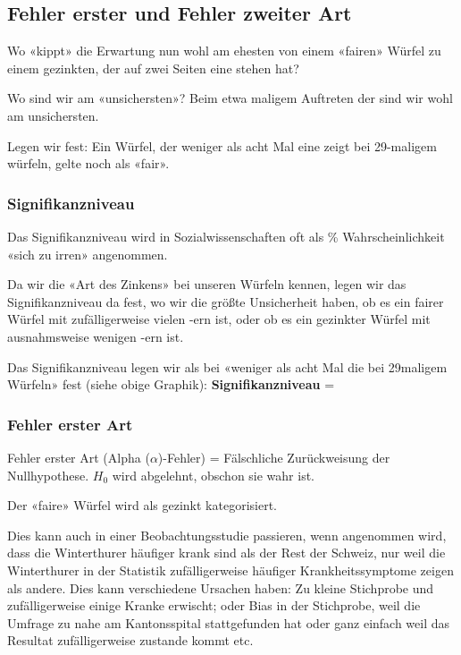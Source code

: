 \newpage


\subsection{Fehler erster und Fehler zweiter Art}
Wo «kippt» die Erwartung nun wohl am ehesten von einem «fairen» Würfel
zu einem gezinkten, der auf zwei Seiten eine  stehen hat?

Wo sind wir am «unsichersten»?
Beim etwa  maligem Auftreten der  sind wir
wohl am unsichersten.

Legen wir fest: Ein Würfel, der weniger als acht Mal
eine  zeigt bei 29-maligem würfeln, gelte noch als «fair».

\subsubsection{Signifikanzniveau}
Das Signifikanzniveau wird in Sozialwissenschaften oft als  \%
Wahrscheinlichkeit «sich zu irren» angenommen.

Da wir die «Art des Zinkens» bei unseren Würfeln kennen, legen wir das
Signifikanzniveau da fest, wo wir die größte Unsicherheit haben, ob
es ein fairer Würfel mit zufälligerweise vielen -ern ist,
oder ob es ein gezinkter Würfel mit ausnahmsweise wenigen
-ern ist.

Das Signifikanzniveau legen wir als bei «weniger als acht Mal die
 bei 29maligem Würfeln» fest (siehe obige Graphik):
\vspace{15mm}
\textbf{Signifikanzniveau} = 


\subsubsection{Fehler erster Art}
Fehler erster Art (Alpha ($\alpha$)-Fehler) = Fälschliche
Zurückweisung der Nullhypothese. $H_0$ wird abgelehnt, obschon sie
wahr ist. 

Der «faire» Würfel wird als gezinkt kategorisiert.

Dies kann auch in einer Beobachtungsstudie passieren, wenn \zB
angenommen wird, dass die Winterthurer häufiger krank sind als der
Rest der Schweiz, nur weil die Winterthurer in der Statistik
zufälligerweise häufiger Krankheitssymptome zeigen als andere. Dies
kann verschiedene Ursachen haben: Zu kleine Stichprobe und
zufälligerweise einige Kranke erwischt; oder Bias in der Stichprobe,
weil die Umfrage zu nahe am Kantonsspital stattgefunden hat oder ganz
einfach weil das Resultat zufälligerweise zustande kommt etc.

